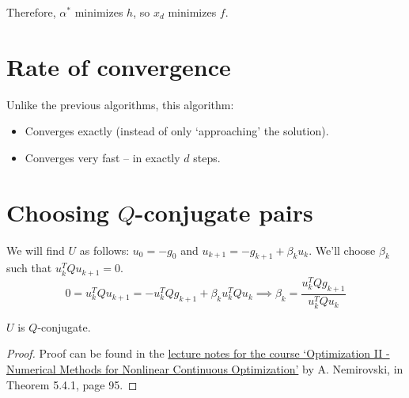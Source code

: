 Therefore, $\alpha^*$ minimizes $h$, so $x_d$ minimizes $f$.

\section{Rate of convergence}

Unlike the previous algorithms, this algorithm:
\begin{itemize}
\item Converges exactly (instead of only `approaching' the solution).
\item Converges very fast -- in exactly $d$ steps.
\end{itemize}

\section{Choosing \texorpdfstring{$Q$}{Q}-conjugate pairs}

We will find $U$ as follows:
$u_0 = -g_0$ and $u_{k+1} = -g_{k+1} + \beta_k u_k$.
We'll choose $\beta_k$ such that $u_k^TQu_{k+1} = 0$.
\[ 0 = u_k^TQu_{k+1} = -u_k^TQg_{k+1} + \beta_k u_k^TQu_k
\implies \beta_k = \frac{u_k^TQg_{k+1}}{u_k^TQu_k} \]

\begin{theorem}
$U$ is $Q$-conjugate.
\end{theorem}
\begin{proof}
Proof can be found in the
\href{https://www2.isye.gatech.edu/~nemirovs/Lect_OptII.pdf}{
lecture notes for the course
`Optimization II - Numerical Methods for Nonlinear Continuous Optimization'}
by A. Nemirovski, in Theorem 5.4.1, page 95.
\end{proof}



